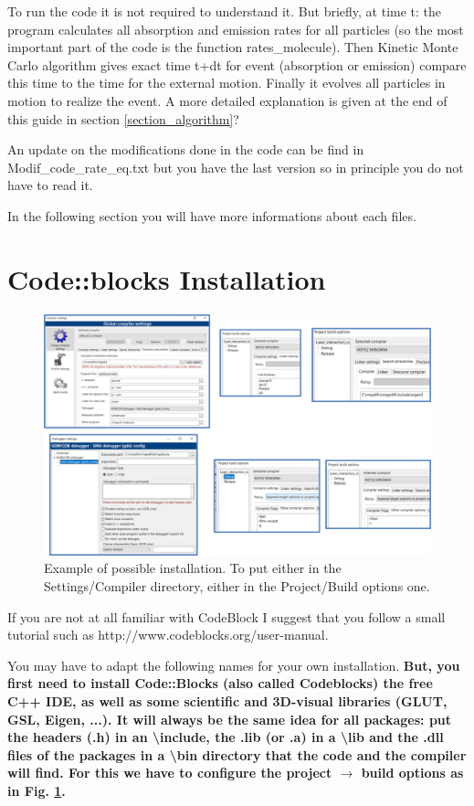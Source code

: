 \documentclass[amsmath,amssymb,nofootinbib]{revtex4-2}
\begin{document}
		

To run the code it is not required to understand it. But briefly, at time t: the program calculates all absorption and emission rates for all particles (so the most important part of the code is the function rates\_molecule). Then Kinetic Monte Carlo algorithm gives exact time t+dt for event (absorption or emission) compare this time to the time for the external motion. Finally it evolves all particles in motion to realize the event. A more detailed explanation is given at the end of this guide in section \ref{section_algorithm}?


An update on the modifications done in the code can be find in Modif\_code\_rate\_eq.txt but you have the last version so in principle you do not have to read it.


In the following section you will have more informations about each files.

\section{Code::blocks Installation}






\begin{figure}
	\centering
	\includegraphics[width=1\linewidth]{linker}
	\caption{Example of possible installation. To put either in the Settings/Compiler directory, either in the Project/Build options one.}
	\label{fig:linker}
\end{figure}

	
If you are not at all familiar with CodeBlock I suggest that you follow a small tutorial such as http://www.codeblocks.org/user-manual.



You may have to adapt the following names for your own installation.
\textbf{But, you first need to install Code::Blocks (also called Codeblocks) the free  C++  IDE, 
	as well as some scientific and 3D-visual libraries (GLUT, GSL, Eigen, ...).  It will always be the same idea for all packages: put the headers (.h) in an \textbackslash{}include, the .lib (or .a) in a \textbackslash{}lib   and the .dll files of the packages in  a \textbackslash{}bin directory
	that the code and the compiler will find. For this we have to configure the  project $\rightarrow$ build options as in Fig. \ref{fig:linker}.}
\end{document}
